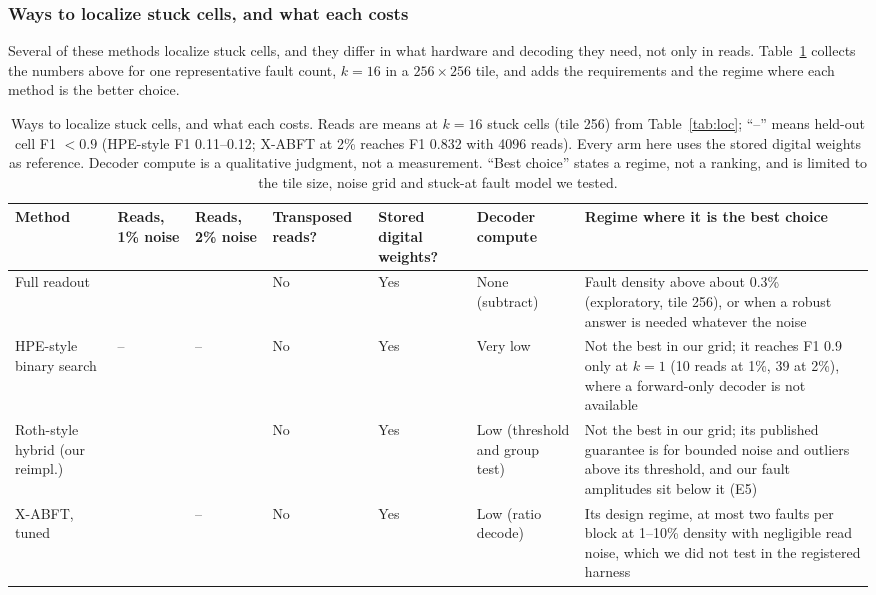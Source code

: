 \documentclass[journal]{IEEEtran}
\begin{document}
\subsubsection{Ways to localize stuck cells, and what each costs}
\label{sec:tradeoff}
Several of these methods localize stuck cells, and they differ in what hardware and decoding they need, not only in reads.
Table~\ref{tab:tradeoff} collects the numbers above for one representative fault count, $k=16$ in a $256\times256$ tile, and adds the requirements and the regime where each method is the better choice.

\begin{table}[t]
\caption{Ways to localize stuck cells, and what each costs. Reads are means at $k=16$ stuck cells (tile 256) from Table~\ref{tab:loc}; ``--'' means held-out cell F1 $<0.9$ (HPE-style F1 0.11--0.12; X-ABFT at 2\% reaches F1 0.832 with 4096 reads). Every arm here uses the stored digital weights as reference. Decoder compute is a qualitative judgment, not a measurement. ``Best choice'' states a regime, not a ranking, and is limited to the tile size, noise grid and stuck-at fault model we tested.}
\label{tab:tradeoff}
\footnotesize
\begin{tabular}{@{}>{\raggedright\arraybackslash}p{2.4cm}>{\raggedright\arraybackslash}p{1.2cm}>{\raggedright\arraybackslash}p{1.2cm}>{\raggedright\arraybackslash}p{1.3cm}>{\raggedright\arraybackslash}p{1.3cm}>{\raggedright\arraybackslash}p{2.6cm}>{\raggedright\arraybackslash}p{5.0cm}@{}}
\toprule
Method & Reads, 1\% noise & Reads, 2\% noise & Transposed reads? & Stored digital weights? & Decoder compute & Regime where it is the best choice \\
\midrule
Full readout & 256 & 256 & No & Yes & None (subtract) & Fault density above about 0.3\% (exploratory, tile 256), or when a robust answer is needed whatever the noise \\
HPE-style binary search & -- & -- & No & Yes & Very low & Not the best in our grid; it reaches F1 0.9 only at $k=1$ (10 reads at 1\%, 39 at 2\%), where a forward-only decoder is not available \\
Roth-style hybrid (our reimpl.) & 51 & 65 & No & Yes & Low (threshold and group test) & Not the best in our grid; its published guarantee is for bounded noise and outliers above its threshold, and our fault amplitudes sit below it (E5) \\
X-ABFT, tuned & 4096 & -- & No & Yes & Low (ratio decode) & Its design regime, at most two faults per block at 1--10\% density with negligible read noise, which we did not test in the registered harness \\

\end{tabular}
\end{table}
\end{document}
